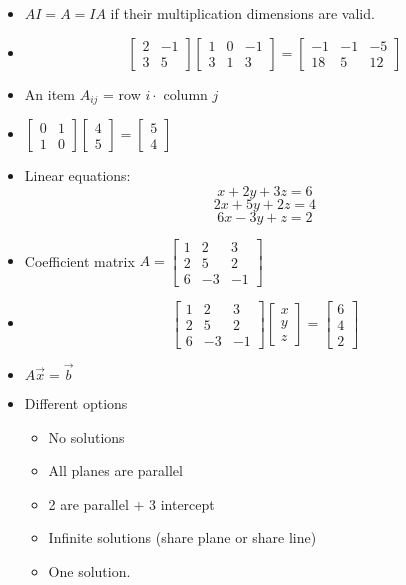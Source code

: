 \begin{itemize}
    \item $AI = A = IA$ if their multiplication dimensions are valid.
    \item $$\begin{bmatrix}2&-1\\3&5\end{bmatrix}\begin{bmatrix}1&0&-1\\3&1&3\end{bmatrix}=\begin{bmatrix}-1&-1&-5\\ 18&5&12\end{bmatrix}$$
    \item An item $A_{ij}$ = row $i \cdot$ column $j$
    \item $\begin{bmatrix}0&1\\1&0\end{bmatrix}\begin{bmatrix}4\\5\end{bmatrix}=\begin{bmatrix}5\\4\end{bmatrix}$
    \item Linear equations:
    $$x+2y+3z=6$$
    $$2x+5y+2z=4$$
    $$6x-3y+z=2$$
    \item Coefficient matrix $A=\begin{bmatrix}1&2&3\\2&5&2\\6&-3&-1\end{bmatrix}$
    \item $$\begin{bmatrix}1&2&3\\2&5&2\\6&-3&-1\end{bmatrix}\begin{bmatrix}x\\y\\z\end{bmatrix}=\begin{bmatrix}6\\4\\2\end{bmatrix}$$
    \item $A\vec{x}=\vec{b}$
    \item Different options
    \begin{itemize}
        \item No solutions
        \item All planes are parallel
        \item 2 are parallel + 3 intercept
        \item Infinite solutions (share plane or share line)
        \item One solution.
    \end{itemize}
\end{itemize}

